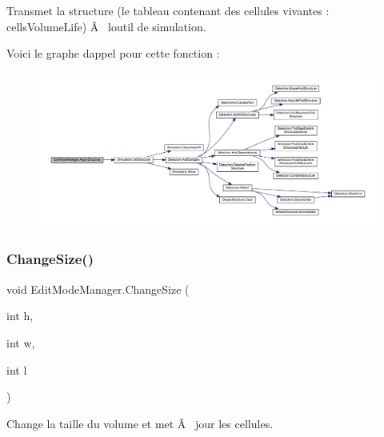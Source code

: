 Transmet la structure (le tableau contenant des cellules vivantes \+: cells\+Volume\+Life) Ã  l\textquotesingle{}outil de simulation. 

Voici le graphe d\textquotesingle{}appel pour cette fonction \+:
\nopagebreak
\begin{figure}[H]
\begin{center}
\leavevmode
\includegraphics[width=350pt]{class_edit_mode_manager_ac1d4e4f292d17b4364054f05ddc13bee_cgraph}
\end{center}
\end{figure}
\mbox{\label{class_edit_mode_manager_acab9d2ee3853d18b73e82135d800c341}} 
\subsubsection{\texorpdfstring{Change\+Size()}{ChangeSize()}}
{\footnotesize\ttfamily void Edit\+Mode\+Manager.\+Change\+Size (\begin{DoxyParamCaption}\item[{int}]{h,  }\item[{int}]{w,  }\item[{int}]{l }\end{DoxyParamCaption})\hspace{0.3cm}{\ttfamily [inline]}}



Change la taille du volume et met Ã  jour les cellules. 


